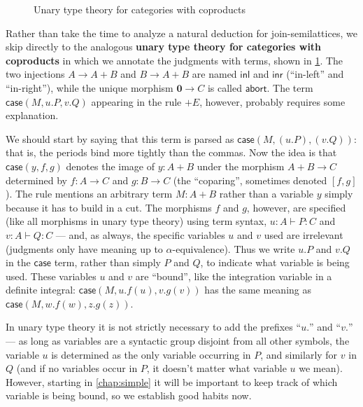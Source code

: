 \documentclass{book}
\def\idfunc{\mathsf{id}}
\let\types\vdash
\def\type{\;\ftype}
\def\plusE{\mathord{+}E}
\def\plusI{\mathord{+}I}
\def\inl{\mathsf{inl}}
\def\inr{\mathsf{inr}}
\def\case{\mathsf{case}}
\def\emptyt{\mathbf{0}}
\def\abort{\mathsf{abort}}
\begin{document}
\begin{figure}
  \centering
  \caption{Unary type theory for categories with coproducts}
  \label{fig:catcoprod}
\end{figure}

Rather than take the time to analyze a natural deduction for join-semilattices, we skip directly to the analogous \textbf{unary type theory for categories with coproducts} in which we annotate the judgments with terms, shown in \cref{fig:catcoprod}.
The two injections $A\to A+B$ and $B\to A+B$ are named $\inl$ and $\inr$ (``in-left'' and ``in-right''), while the unique morphism $\emptyt \to C$ is called $\abort$.
The term $\case(M,u.P,v.Q)$ appearing in the rule $\plusE$, however, probably requires some explanation.

We should start by saying that this term is parsed as $\case(M,(u.P),(v.Q))$: that is, the periods bind more tightly than the commas.
Now the idea is that $\case(y,f,g)$ denotes the image of $y:A+B$ under the morphism $A+B\to C$ determined by $f:A\to C$ and $g:B\to C$ (the ``coparing'', sometimes denoted $[f,g]$).
The rule mentions an arbitrary term $M:A+B$ rather than a variable $y$ simply because it has to build in a cut.
The morphisms $f$ and $g$, however, are specified (like all morphisms in unary type theory) using term syntax, $u:A\types P:C$ and $v:A\types Q:C$ --- and, as always, the specific variables $u$ and $v$ used are irrelevant (judgments only have meaning up to $\alpha$-equivalence).
Thus we write $u.P$ and $v.Q$ in the $\case$ term, rather than simply $P$ and $Q$, to indicate what variable is being used.
These variables $u$ and $v$ are ``bound'', like the integration variable in a definite integral: $\case(M,u.f(u),v.g(v))$ has the same meaning as $\case(M,w.f(w),z.g(z))$.

\begin{rmk}
  In unary type theory it is not strictly necessary to add the prefixes ``$u.$'' and ``$v.$'' --- as long as variables are a syntactic group disjoint from all other symbols, the variable $u$ is determined as the only variable occurring in $P$, and similarly for $v$ in $Q$ (and if no variables occur in $P$, it doesn't matter what variable $u$ we mean).
  However, starting in \cref{chap:simple} it will be important to keep track of which variable is being bound, so we establish good habits now.
\end{rmk}
\end{document}

